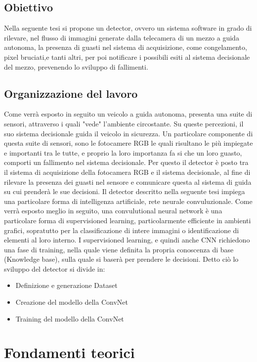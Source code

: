 \documentclass[14pt]{extarticle}
\begin{document}
\subsection{Obiettivo}
Nella seguente tesi si propone un detector, ovvero un sistema software in grado di rilevare, nel flusso di immagini generate dalla telecamera di un mezzo a guida autonoma, la presenza di guasti nel sistema di acquisizione, come congelamento, pixel bruciati,e tanti altri, per poi notificare i possibili esiti al sistema  decisionale del mezzo, prevenendo lo sviluppo di fallimenti.
\subsection{Organizzazione del lavoro} 
Come verrà esposto in seguito un veicolo a guida autonoma, presenta una suite di sensori, attraverso i quali "vede" l'ambiente circostante. Su queste percezioni, il suo sistema decisionale guida il veicolo in sicurezza.
Un particolare componente di questa suite di sensori, sono le fotocamere RGB le quali risultano le più impiegate e importanti tra le tutte, e proprio la  loro importanza fa si che un loro guasto,  comporti un fallimento nel sistema decisionale.
Per questo il detector è posto tra il  sistema di acquisizione della fotocamera RGB e il sistema decisionale, al fine di rilevare la presenza dei guasti nel sensore e comunicare questa al sistema di guida su cui prenderà  le sue decisioni.
Il detector descritto nella seguente tesi impiega una particolare forma di intelligenza artificiale, rete neurale convuluzionale.
Come verrà esposto meglio in seguito, una convulutional neural network è una particolare forma di supervisioned learning, particolarmente efficiente in ambienti grafici, sopratutto per la classificazione di intere immagini o identificazione di elementi al loro interno. I supervisioned learning, e quindi anche CNN richiedono una fase di training, nella quale viene definita  la propria conoscenza di base (Knowledge base), sulla quale si baserà per prendere le decisioni.
Detto ciò lo sviluppo del detector si divide in:
\begin{itemize}
\item Definizione e generazione Dataset
\item Creazione del modello della ConvNet
\item Training del modello della ConvNet
\end{itemize}

\section{Fondamenti teorici}
\end{document}
